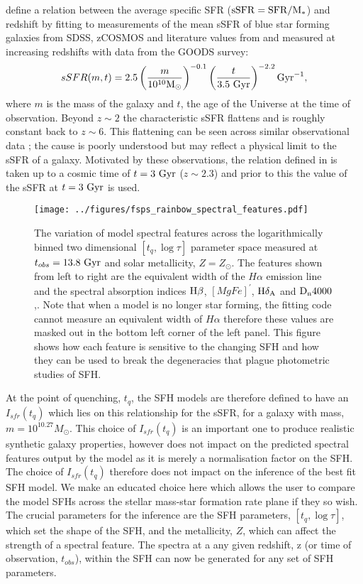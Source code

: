 \documentclass[useAMS,usenatbib]{mn2e}
\begin{document}
\citet[][Equation 1]{peng10} define a relation between the average specific SFR ($\rm{sSFR}=SFR/M_*$) and redshift by fitting to measurements of the mean sSFR of blue star forming galaxies from SDSS, zCOSMOS and literature values from \cite{elbaz07} and \cite{daddi07} measured at increasing redshifts with data from the GOODS survey:
\begin{equation}\label{eq:peng}
sSFR(m,t) = 2.5 \left( \frac{m}{10^{10} \rm{M}_{\odot}} \right)^{-0.1} \left(\frac{t}{3.5 ~\rm{Gyr}}\right)^{-2.2} \rm{Gyr}^{-1},
\end{equation}
where $m$ is the mass of the galaxy and $t$, the age of the Universe at the time of observation. Beyond $z \sim 2$ the characteristic sSFR flattens and is roughly constant back to $z\sim6$. This flattening can be seen across similar observational data \citep{peng10, gonzalez10, bethermin12}; the cause is poorly understood but may reflect a physical limit to the sSFR of a galaxy. Motivated by these observations, the relation defined in \citet{peng10} is taken up to a cosmic time of $t=3~\rm{Gyr}$ ($z \sim 2.3$) and prior to this the value of the sSFR at $t=3~\rm{Gyr}$ is used. 

\begin{figure*}
\centering
\texttt{[image: ../figures/fsps\_rainbow\_spectral\_features.pdf]}
\caption{The variation of model spectral features across the logarithmically binned two dimensional $[t_q, \log \tau]$ parameter space measured at $t_{obs}=13.8~\rm{Gyr}$ and solar metallicity, $Z=Z_{\odot}$. The features shown from left to right are the equivalent width of the $H\alpha$ emission line and the spectral absorption indices $\rm{H}\beta$, $[MgFe]^{\prime}$, $\rm{H}\delta_A$ and $\rm{D}_n4000$,. Note that when a model is no longer star forming, the fitting code cannot measure an equivalent width of $H\alpha$ therefore these values are masked out in the bottom left corner of the left panel. This figure shows how each feature is sensitive to the changing SFH and how they can be used to break the degeneracies that plague photometric studies of SFH. }
\label{fig:rainbow}
\end{figure*}

At the point of quenching, $t_{q}$, the SFH models are therefore defined to have an $I_{sfr}(t_q)$ which lies on this relationship for the sSFR, for a galaxy with mass, $m = 10^{10.27} M_{\odot}$. This choice of $I_{sfr}(t_q)$ is an important one to produce realistic synthetic galaxy properties, however does not impact on the predicted spectral features output by the model as it is merely a normalisation factor on the SFH. The choice of $I_{sfr}(t_q)$ therefore does not impact on the inference of the best fit SFH model. We make an educated choice here which allows the user to compare the model SFHs across the stellar mass-star formation rate plane if they so wish. The crucial parameters for the inference are the SFH parameters, $[t_q, \log \tau]$, which set the shape of the SFH, and the metallicity, $Z$, which can affect the strength of a spectral feature. The spectra at a any given redshift, z (or time of observation, $t_{obs}$), within the SFH can now be generated for any set of SFH parameters.
\end{document}
